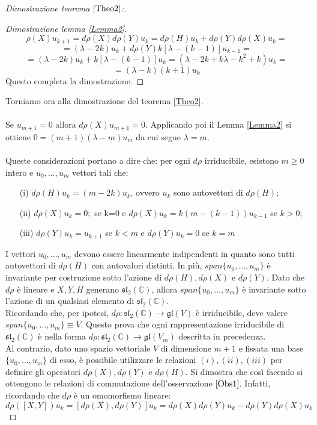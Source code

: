 \documentclass[12pt,a4paper]{report}
\theoremstyle{definition}
\theoremstyle{Theorem}
\theoremstyle{definition}
\theoremstyle{definition}
\theoremstyle{definition}
\begin{document}
\begin{proof}[Dimostrazione teorema $\ref{Theo2}$:]
\begin{proof} [Dimostrazione lemma \ref{Lemma2}]
	$$\rho(X)u_{k+1}=d\rho(X)d\rho(Y)u_{k}=d\rho(H)u_k+d\rho(Y)d\rho(X)u_k=$$
	$$=(\lambda-2k)u_k+d\rho(Y)k[\lambda-(k-1)]u_{k-1}=$$ 
	$$=(\lambda-2k)u_k+k[\lambda-(k-1)]u_{k}=(\lambda-2k+k\lambda-k^2+k)u_k=$$
	$$=(\lambda-k)(k+1)u_k$$
	Questo completa la dimostrazione.
\end{proof}
Torniamo ora alla dimostrazione del teorema \ref{Theo2}. \\\\
Se $u_{m+1}=0$ allora $d\rho(X)u_{m+1}=0$. Applicando poi il Lemma \ref{Lemma2} si ottiene $0=(m+1)(\lambda-m)u_m$ da cui segue $\lambda=m$.\\
\\
	Queste considerazioni portano a dire che: per ogni $d\rho $ irriducibile, esistono $m\geq0$ intero e $u_0,...,u_m$ vettori tali che:\begin{itemize}
		\item[(i)] $d\rho(H)u_k=(m-2k)u_k$, ovvero $u_k$ sono autovettori di $d\rho(H)$;
		\item[(ii)] $d\rho(X)u_k=0;$ se k=0 e $d\rho(X)u_k=k(m-(k-1))u_{k-1}$ se $k>0$;
		\item[(iii)] $d\rho(Y)u_k=u_{k+1}$ se $k<m$ e $d\rho(Y)u_k=0$ se $k=m$
	\end{itemize}
I vettori $u_0,...,u_m$ devono essere linearmente indipendenti in quanto sono tutti autovettori di $d\rho(H)$ con autovalori distinti. In più, $span\{u_0,...,u_m\}$ è invariante per costruzione sotto l'azione di $d\rho(H),d\rho(X)$ e $d\rho(Y)$. Dato che $d\rho$ è lineare e $X,Y,H$ generano $\mathfrak{sl_2(\mathbb{C})}$, allora $span\{u_0,...,u_m\}$ è invariante sotto l'azione di un qualsiasi elemento di $\mathfrak{sl_2(\mathbb{C})}$.\\
Ricordando che, per ipotesi, $d\rho:\mathfrak{sl_2(\mathbb{C})}\rightarrow \mathfrak{gl}(V)$ è irriducibile, deve valere\\ $span\{u_0,...,u_m\}\equiv V$. Questo prova che ogni rappresentazione irriducibile di $\mathfrak{sl_2(\mathbb{C})}$ è nella forma $d\rho:\mathfrak{sl_2(\mathbb{C})}\rightarrow \mathfrak{gl}(V_m)$ descritta in precedenza.\\
Al contrario, dato uno spazio vettoriale $V$ di dimensione $m+1$ e fissata una base $\{u_0,...,u_m\}$ di esso, è possibile utilizzare le relazioni $(i),(ii),(iii)$ per definire gli operatori $d\rho(X),d\rho(Y)$ e $d\rho(H)$. Si dimostra che così facendo si ottengono le relazioni di commutazione dell'osservazione $\ref{Obs1}$. Infatti, ricordando che $d\rho$ è un omomorfismo lineare:
$$d\rho([X,Y])u_k=[d\rho(X),d\rho(Y)]u_k=d\rho(X)d\rho(Y)u_k-d\rho(Y)d\rho(X)u_k$$

\end{proof}
\end{document}
